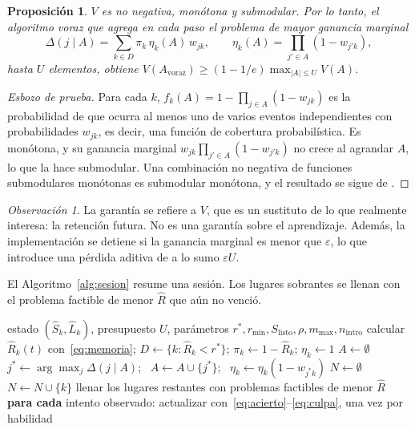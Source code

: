 \documentclass[11pt]{article}
\newtheorem{proposicion}{Proposición}
\theoremstyle{definition}
\theoremstyle{remark}
\newtheorem{observacion}{Observación}
\newcommand{\Rh}{\hat R}
\newcommand{\Sh}{\hat S}
\newcommand{\Lh}{\hat L}
\newcommand{\rstar}{r^{\ast}}
\newcommand{\Slisto}{S_{\mathrm{listo}}}
\begin{document}
\begin{proposicion}
\label{prop:submod}
$V$ es no negativa, monótona y submodular. Por lo tanto, el algoritmo voraz que agrega en cada paso el problema de mayor ganancia marginal
\begin{equation}
\Delta(j\mid A)=\sum_{k\in D}\pi_k\,\eta_k(A)\,w_{jk},\qquad \eta_k(A)=\prod_{j'\in A}(1-w_{j'k}),
\label{eq:ganancia}
\end{equation}
hasta $U$ elementos, obtiene $V(A_{\mathrm{voraz}})\ge(1-1/e)\max_{|A|\le U}V(A)$.
\end{proposicion}
\begin{proof}[Esbozo de prueba]
Para cada $k$, $f_k(A)=1-\prod_{j\in A}(1-w_{jk})$ es la probabilidad de que ocurra al menos uno de varios eventos independientes con probabilidades $w_{jk}$, es decir, una función de cobertura probabilística. Es monótona, y su ganancia marginal $w_{jk}\prod_{j'\in A}(1-w_{j'k})$ no crece al agrandar $A$, lo que la hace submodular. Una combinación no negativa de funciones submodulares monótonas es submodular monótona, y el resultado se sigue de \citet{nemhauser1978}.
\end{proof}

\begin{observacion}
La garantía se refiere a $V$, que es un sustituto de lo que realmente interesa: la retención futura. No es una garantía sobre el aprendizaje. Además, la implementación se detiene si la ganancia marginal es menor que $\varepsilon$, lo que introduce una pérdida aditiva de a lo sumo $\varepsilon U$.
\end{observacion}

El Algoritmo~\ref{alg:sesion} resume una sesión. Los lugares sobrantes se llenan con el problema factible de menor $\Rh$ que aún no venció.

\begin{algorithm}[t]
\caption{Planificación de una sesión ($\eta_k$ es la fracción de $k$ aún sin cubrir)}
\label{alg:sesion}
\small
\begin{algorithmic}[1]
\Require estado $(\Sh_k,\Lh_k)$, presupuesto $U$, parámetros $\rstar,r_{\min},\Slisto,\rho,m_{\max},n_{\mathrm{intro}}$
\State calcular $\Rh_k(t)$ con~\eqref{eq:memoria}; $D\gets\{k:\Rh_k<\rstar\}$; $\pi_k\gets1-\Rh_k$; $\eta_k\gets1$
\State $A\gets\emptyset$
 
  \State $j^\ast\gets\arg\max_j\Delta(j\mid A)$; \ $A\gets A\cup\{j^\ast\}$; \ $\eta_k\gets\eta_k(1-w_{j^\ast k})$
\EndWhile
\State $N\gets\emptyset$
 
  \State $N\gets N\cup\{k\}$
\EndWhile
\State llenar los lugares restantes con problemas factibles de menor $\Rh$
\State \textbf{para cada} intento observado: actualizar con~\eqref{eq:acierto}--\eqref{eq:culpa}, una vez por habilidad
\end{algorithmic}
\end{algorithm}
\end{document}
